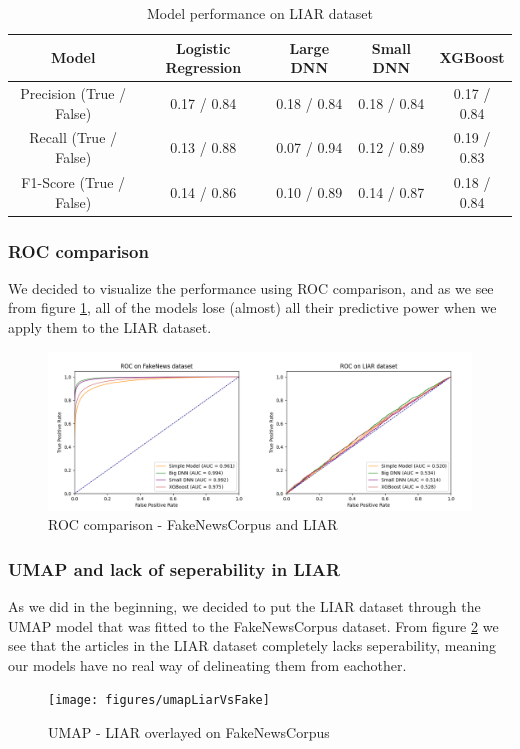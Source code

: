 \begin{table}[htpb]
  \centering
  \caption{Model performance on LIAR dataset}
  \label{tab:liarperformance}
  \begin{tabular}{c|cccc}
    Model & Logistic Regression & Large DNN & Small DNN & XGBoost \\ \hline
    Precision (True / False) & 0.17 / 0.84  & 0.18 / 0.84 & 0.18 / 0.84 & 0.17 / 0.84 \\ \hline
    Recall (True / False) & 0.13 / 0.88 & 0.07 / 0.94 & 0.12 / 0.89 & 0.19 / 0.83 \\ \hline
    F1-Score (True / False) & 0.14 / 0.86 & 0.10 / 0.89 & 0.14 / 0.87 & 0.18 / 0.84 \\ \hline
  \end{tabular}
\end{table}

\subsubsection{ROC comparison}
We decided to visualize the performance using ROC comparison, and as we see from figure \ref{fig:roc}, all of the models lose
(almost) all their predictive power when we apply them to the LIAR dataset.

\begin{figure}[htpb]
  \centering
  \includegraphics[width=1\textwidth]{figures/ROC_combined}
  \caption{ROC comparison - FakeNewsCorpus and LIAR}
  \label{fig:roc}
\end{figure}


\subsubsection{UMAP and lack of seperability in LIAR}
As we did in the beginning, we decided to put the LIAR dataset through the UMAP model that was fitted to the
FakeNewsCorpus dataset. From figure \ref{fig:liarvsfake} we see that the articles in the LIAR dataset completely lacks seperability,
meaning our models have no real way of delineating them from eachother.
\begin{figure}[htpb]
  \centering
  \texttt{[image: figures/umapLiarVsFake]}
  \caption{UMAP - LIAR overlayed on FakeNewsCorpus}
  \label{fig:liarvsfake}
\end{figure}

